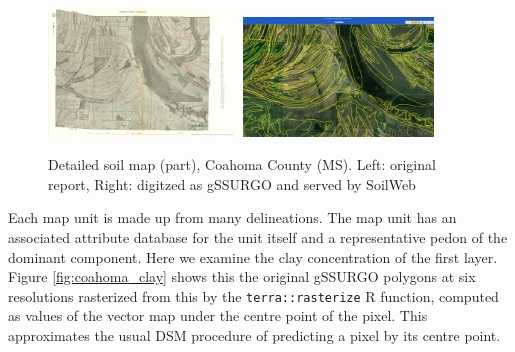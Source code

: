 \documentclass[soil, manuscript]{copernicus}
\begin{document}
\begin{figure}
  \includegraphics[width=0.45\textwidth]{usda-general-soil-map-of-coahoma-county-mississippi_Plate32.jpg}
  \hfill
  \includegraphics[width=0.45\textwidth]{SoilWeb_coahoma-county-mississipp_Plate32.png} 
 \caption{Detailed soil map (part), Coahoma County (MS). Left: original report, Right: digitzed as gSSURGO and served by SoilWeb}
  \label{fig:coahoma}
\end{figure}

%
\par
Each map unit is made up from many delineations. The map unit has an associated attribute database for the unit itself and a representative pedon of the dominant component.
%
Here we examine the clay concentration of the first layer.
%
Figure \ref{fig:coahoma_clay} shows this the original gSSURGO polygons at six resolutions rasterized from this by the \texttt{terra::rasterize} R function, computed as values of the vector map under the centre point of the  pixel.
%
This approximates the usual DSM procedure of predicting a pixel by its centre point.
\end{document}
